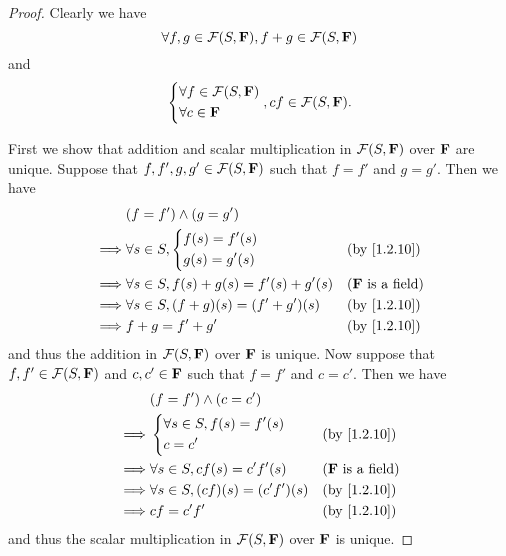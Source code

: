 \begin{proof}
    Clearly we have
    \[
        \forall f, g \in \mathcal{F}\p{S, \F}, f + g \in \mathcal{F}\p{S, \F}
    \]
    and
    \[
        \begin{dcases}
            \forall f \in \mathcal{F}\p{S, \F} \\
            \forall c \in \F
        \end{dcases}, cf \in \mathcal{F}\p{S, \F}.
    \]

    First we show that addition and scalar multiplication in \(\mathcal{F}\p{S, \F}\) over \(\mathbf{F}\) are unique.
    Suppose that \(f, f', g, g' \in \mathcal{F}\p{S, \F}\) such that \(f = f'\) and \(g = g'\).
    Then we have
    \begin{align*}
                 & \p{f = f'} \land \p{g = g'}                                                          \\
        \implies & \forall s \in S, \begin{dcases}
            f\p{s} = f'\p{s} \\
            g\p{s} = g'\p{s}
        \end{dcases}          &  & \text{(by \cref{1.2.10})}  \\
        \implies & \forall s \in S, f\p{s} + g\p{s} = f'\p{s} + g'\p{s} &  & \text{(\(\F\) is a field)} \\
        \implies & \forall s \in S, (f + g)\p{s} = (f' + g')\p{s}       &  & \text{(by \cref{1.2.10})}  \\
        \implies & f + g = f' + g'                                      &  & \text{(by \cref{1.2.10})}
    \end{align*}
    and thus the addition in \(\mathcal{F}\p{S, \F}\) over \(\mathbf{F}\) is unique.
    Now suppose that \(f, f' \in \mathcal{F}\p{S, \F}\) and \(c, c' \in \mathbf{F}\) such that \(f = f'\) and \(c = c'\).
    Then we have
    \begin{align*}
                 & \p{f = f'} \land \p{c = c'}                                                   \\
        \implies & \begin{dcases}
            \forall s \in S, f\p{s} = f'\p{s} \\
            c = c'
        \end{dcases}                    &  & \text{(by \cref{1.2.10})}  \\
        \implies & \forall s \in S, c f\p{s} = c' f'\p{s}        &  & \text{(\(\F\) is a field)} \\
        \implies & \forall s \in S, \p{cf}\p{s} = \p{c' f'}\p{s} &  & \text{(by \cref{1.2.10})}  \\
        \implies & cf = c' f'                                    &  & \text{(by \cref{1.2.10})}
    \end{align*}
    and thus the scalar multiplication in \(\mathcal{F}\p{S, \F}\) over \(\mathbf{F}\) is unique.


\end{proof}
